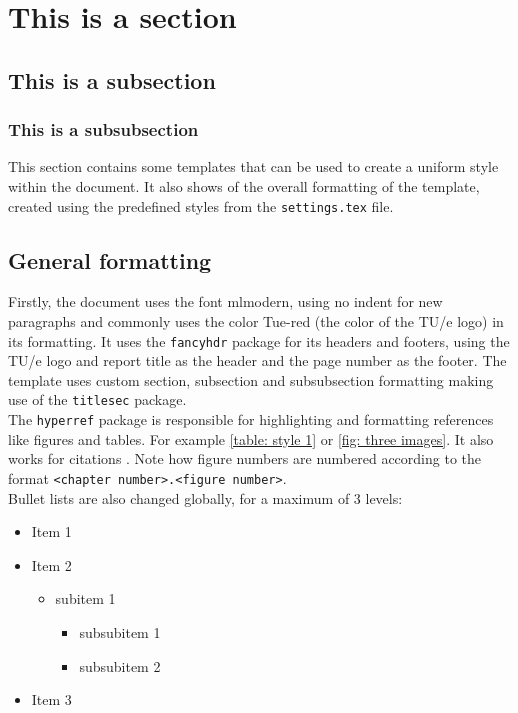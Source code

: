 \section{This is a section} 
\subsection{This is a subsection}

\subsubsection{This is a subsubsection}
This section contains some templates that can be used to create a uniform style within the document. It also shows of the overall formatting of the template, created using the predefined styles from the \texttt{settings.tex} file.

\subsection{General formatting}
Firstly, the document uses the font mlmodern, using no indent for new paragraphs and commonly uses the color \textcolor{Tue-red}{Tue-red} (the color of the TU/e logo) in its formatting. It uses the \texttt{fancyhdr} package for its headers and footers, using the TU/e logo and report title as the header and the page number as the footer. The template uses custom section, subsection and subsubsection formatting making use of the \texttt{titlesec} package.\\
The \texttt{hyperref} package is responsible for highlighting and formatting references like figures and tables. For example \cref{table: style 1} or \cref{fig: three images}. It also works for citations \cite{texbook}. Note how figure numbers are numbered according to the format \texttt{<chapter number>.<figure number>}.\\

Bullet lists are also changed globally, for a maximum of 3 levels:

\begin{itemize}
    \item Item 1
    \item Item 2
    \begin{itemize}
        \item subitem 1
        \begin{itemize}
            \item subsubitem 1
            \item subsubitem 2
        \end{itemize}
    \end{itemize}
    \item Item 3
\end{itemize}

